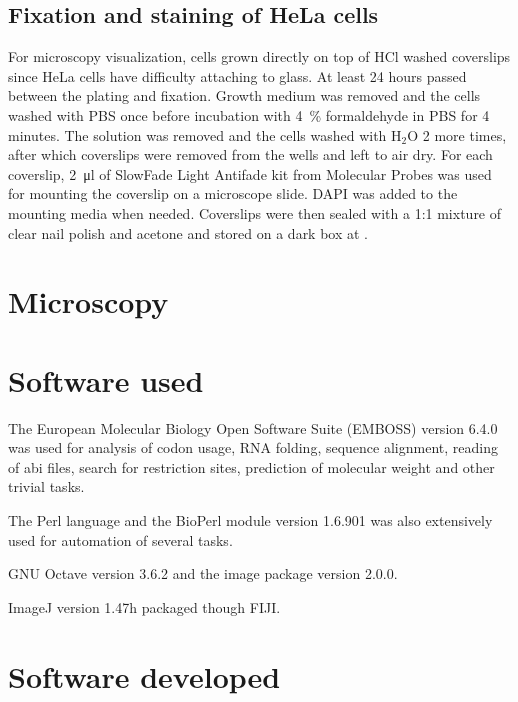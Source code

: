   \subsection{Fixation and staining of HeLa cells}
    For microscopy visualization, cells grown directly on top of HCl washed coverslips since
    HeLa cells have difficulty attaching to glass. At least 24 hours passed
    between the plating and fixation. Growth medium was removed and the cells
    washed with PBS once before incubation with \SI{4}{\percent} formaldehyde in PBS
    for 4 minutes. The solution was removed and the cells washed with H$_2$O 2 more
    times, after which coverslips were removed from the wells and left to air dry.
    For each coverslip, \SI{2}{\ul} of SlowFade Light Antifade kit from Molecular Probes
    was used for mounting the coverslip on a microscope slide. DAPI was added
    to the mounting media when needed. Coverslips were then sealed with a 1:1
    mixture of clear nail polish and acetone and stored on a dark box at .


\section{Microscopy}
\section{Software used}
  The European Molecular Biology Open Software Suite (EMBOSS) version 6.4.0
  was used for analysis of codon usage, RNA folding, sequence alignment, reading of abi
  files, search for restriction sites, prediction of molecular weight and
  other trivial tasks.

  The Perl language and the BioPerl module version 1.6.901 was also extensively used for automation of
  several tasks.
  
  GNU Octave version 3.6.2 and the image package version 2.0.0.
  
  ImageJ version 1.47h packaged though FIJI.

\section{Software developed}




